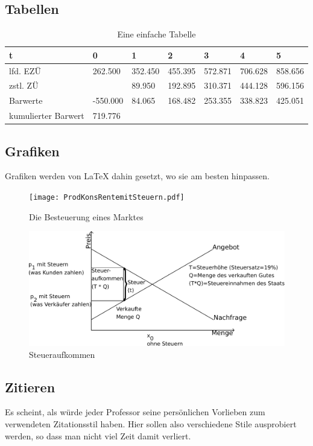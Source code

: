 \subsection{Tabellen}
\begin{table}[htbp]
\begin{tabular}{|l|l|l|l|l|l|l|}
\hline
t & 0 & 1 & 2 & 3 & 4 & 5 \\ \hline
lfd. EZÜ & 262.500 & 352.450 & 455.395 & 572.871 & 706.628 & 858.656 \\ \hline
zstl. ZÜ &  & 89.950 & 192.895 & 310.371 & 444.128 & 596.156 \\ \hline
Barwerte & -550.000 & 84.065 & 168.482 & 253.355 & 338.823 & 425.051 \\ \hline
kumulierter Barwert & 719.776 &  &  &  &  &  \\ \hline
\end{tabular}
\caption{Eine einfache Tabelle}
\end{table}
\subsection{Grafiken}
Grafiken werden von LaTeX dahin gesetzt, wo sie am besten hinpassen.
\begin{figure}[htbp]
  \centering
     \texttt{[image: ProdKonsRentemitSteuern.pdf]}
  \caption{Die Besteuerung eines Marktes}
  \label{fig:Bild1}
\end{figure}
\begin{figure}[htbp]
  \centering
     \includegraphics[]{PMSteuer.pdf}
  \caption{Steueraufkommen}
  \label{fig:Bild2}
\end{figure}
\subsection{Zitieren}
Es scheint, als würde jeder Professor seine persönlichen Vorlieben zum verwendeten Zitationsstil haben. Hier sollen also verschiedene Stile ausprobiert werden, so dass man nicht viel Zeit damit verliert.

